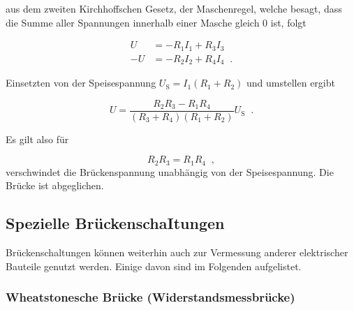         \noindent aus dem zweiten Kirchhoffschen Gesetz, der Maschenregel, welche besagt, dass die Summe aller Spannungen innerhalb einer Masche 
        gleich 0 ist, folgt 

        \begin{align*}
             U &= -R_1 I_1 + R_3 I_3 \\
            -U &= -R_2 I_2 + R_4 I_4 \; \; .
        \end{align*}

        \noindent Einsetzten von der Speisespannung $U_{\text{S}} = I_1 (R_1 + R_2)$ und umstellen ergibt 

        \begin{equation*}
            U = \frac{R_2 R_3 -R_1 R_4}{(R_3 + R_4)(R_1 + R_2)} U_{\text{S}} \; \; .
        \end{equation*}

        \noindent Es gilt also für  
        
        \begin{equation}
         R_2 R_3 = R_1 R_4 \; \; ,
        \label{eq:Widerstand}
        \end{equation}
        \noindent verschwindet die Brückenspannung unabhängig von der Speisespannung. Die Brücke ist 
        abgeglichen.



        

    \subsection{Spezielle BrückenschaItungen}

        \noindent Brückenschaltungen können weiterhin auch zur Vermessung anderer elektrischer Bauteile genutzt werden. Einige davon 
        sind im Folgenden aufgelistet.

        \subsubsection{Wheatstonesche Brücke (Widerstandsmessbrücke)}

